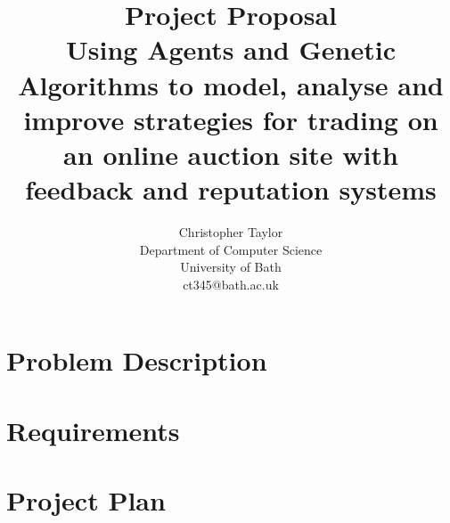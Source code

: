 \documentclass{article}
\title{Project Proposal \\ Using Agents and Genetic Algorithms to model, analyse and improve strategies for trading on an online auction site with feedback and reputation systems}
\author{Christopher Taylor \\ Department of Computer Science \\ University of Bath \\ ct345@bath.ac.uk}
\begin{document}
\maketitle
\section{Problem Description}


\section{Requirements}


\section{Project Plan}
\end{document}
